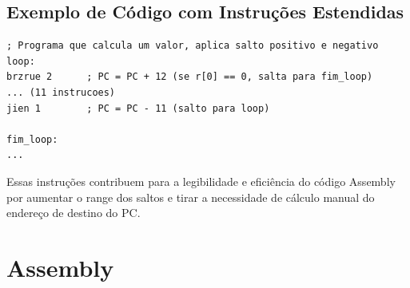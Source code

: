 \documentclass[12pt]{article}
\begin{document}
\subsection{Exemplo de Código com Instruções Estendidas}

\begin{lstlisting}
; Programa que calcula um valor, aplica salto positivo e negativo
loop:
brzrue 2      ; PC = PC + 12 (se r[0] == 0, salta para fim_loop)
... (11 instrucoes)
jien 1        ; PC = PC - 11 (salto para loop)

fim_loop:
...
\end{lstlisting}

Essas instruções contribuem para a legibilidade e eficiência do código Assembly por aumentar o range dos saltos e tirar a necessidade de cálculo manual do endereço de destino do PC.

\section{Assembly}
\end{document}

